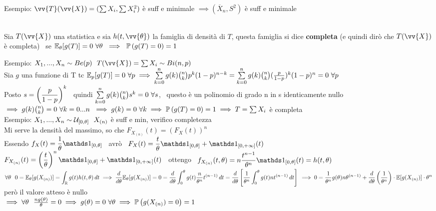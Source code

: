 Esempio: $\vv{T}(\vv{X})=(\sum X_i, \sum X_i^2)$ è suff e minimale $\implies (\overline{X}_n, S^2)$ è suff e minimale\\ \\


\begin{defi}
    Sia $T(\vv{X})$ una statistica e sia $h(t,\vv{\theta})$ la famiglia di densità di $T$, questa famiglia si dice \textbf{completa} (e quindi dirò che $T(\vv{X})$ è completa) \ se $\EE_{\theta}[g(T)]=0 \ \forall \theta \ \implies \ \prob{g(T)=0}=1$
\end{defi}

\vspace{0.7cm}
Esempio: $X_1,...,X_n \sim Be(p) \ \ T(\vv{X})=\sum X_i \sim Bi(n,p)$\\
Sia $g$ una funzione di T tc $\mathbb E_p[g(T)]=0 \ \forall p \implies \sum\limits_{k=0}^{n}g(k)\binom{n}{k}p^k(1-p)^{n-k}=\sum\limits_{k=0}^{n}g(k)\binom{n}{k} ( \tfrac{p}{1-p} )^k (1-p)^n=0 \ \forall p$\\
Posto $s= \left( \dfrac{p}{1-p} \right)^k$ \ quindi $\Sum{k=0}{n}g(k)\binom{n}{k}s^k =0 \ \forall s$, \ questo è un polinomio di grado n in s identicamente nullo $\implies g(k)\binom{n}{k}=0 \ \forall k=0...n \ \implies g(k)=0 \ \forall k \implies \mathbb{P} \left( g(T)=0 \right)=1 \implies T=\sum X_i$ è completa\\

Esempio: $X_1,...,X_n \sim \Uc_{[0,\theta]} \ \ X_{(n)}$ è suff e min, verifico completezza \\
Mi serve la densità del massimo, so che $F_{X_{(n)}}(t)=(F_X(t))^n$ \\ Essendo $f_X(t)=\frac{1}{\theta}\II_{[0,\theta]}$ \ avrò \ $F_X(t)=\frac{t}{\theta}\II_{[0,\theta]} + \II_{[0,+\infty]}(t)$\\
$F_{X_{(n)}}(t)=\O \frac{t}{\theta}\C^n\II_{[0,\theta]} + \II_{[0,+\infty]}(t) $ \ ottengo \ $f_{X_{(n)}}(t,\theta)=n\frac{t^{n-1}}{\theta^n}\II_{[0,\theta]}(t)=h(t,\theta)$\\
$\forall\theta \ \ 0=\EE_{\theta}[g(X_{(n)})]=\int_{\R} g(t)h(t,\theta)\, dt \implies \frac{d}{d\theta}\EE_{\theta}[g(X_{(n)})]=0=\frac{d}{d\theta}\int_0^{\theta}g(t)\frac{n}{\theta^n}t^{(n-1)}\, dt = \frac{d}{d\theta}\OO\frac{1}{\theta^n}\int_0^{\theta}g(t) n t^{(n-1)}\, dt\CC \\ \implies 0=\frac{1}{\theta^n}g(\theta)n\theta^{(n-1)}+\frac{d}{d\theta}\O\frac{1}{\theta^n}\C\cdot\EE[g(X_{(n)})]\cdot \theta^n$ però il valore atteso è nullo \\ $\implies \forall \theta \ \ \tfrac{ng(\theta)}{\theta}=0 \implies g(\theta)=0 \ \forall \theta \implies \prob{g(X_{(n)})=0}=1$ \\




